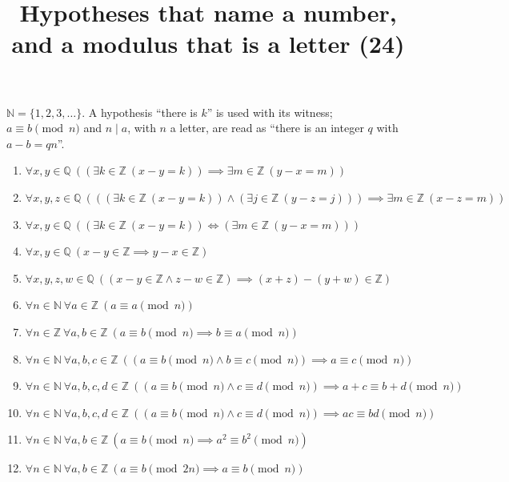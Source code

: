 \documentclass[11pt,a4paper]{article}
\title{Hypotheses that name a number, and a modulus that is a letter (24)}
\author{}
\date{}
\begin{document}
\maketitle
$\mathbb{N} = \{1, 2, 3, \ldots\}$. A hypothesis ``there is $k$'' is used with its witness; $a \equiv b \pmod{n}$ and $n \mid a$, with $n$ a letter, are read as ``there is an integer $q$ with $a - b = qn$''.

\begin{enumerate}
\item $\displaystyle \forall x, y \in \mathbb{Q}\ ((\exists k \in \mathbb{Z}\ (x - y = k)) \implies \exists m \in \mathbb{Z}\ (y - x = m))$
\item $\displaystyle \forall x, y, z \in \mathbb{Q}\ (((\exists k \in \mathbb{Z}\ (x - y = k)) \land (\exists j \in \mathbb{Z}\ (y - z = j))) \implies \exists m \in \mathbb{Z}\ (x - z = m))$
\item $\displaystyle \forall x, y \in \mathbb{Q}\ ((\exists k \in \mathbb{Z}\ (x - y = k)) \iff (\exists m \in \mathbb{Z}\ (y - x = m)))$
\item $\displaystyle \forall x, y \in \mathbb{Q}\ (x - y \in \mathbb{Z} \implies y - x \in \mathbb{Z})$
\item $\displaystyle \forall x, y, z, w \in \mathbb{Q}\ ((x - y \in \mathbb{Z} \land z - w \in \mathbb{Z}) \implies (x + z) - (y + w) \in \mathbb{Z})$
\item $\displaystyle \forall n \in \mathbb{N}\ \forall a \in \mathbb{Z}\ (a \equiv a \pmod{n})$
\item $\displaystyle \forall n \in \mathbb{Z}\ \forall a, b \in \mathbb{Z}\ (a \equiv b \pmod{n} \implies b \equiv a \pmod{n})$
\item $\displaystyle \forall n \in \mathbb{N}\ \forall a, b, c \in \mathbb{Z}\ ((a \equiv b \pmod{n} \land b \equiv c \pmod{n}) \implies a \equiv c \pmod{n})$
\item $\displaystyle \forall n \in \mathbb{N}\ \forall a, b, c, d \in \mathbb{Z}\ ((a \equiv b \pmod{n} \land c \equiv d \pmod{n}) \implies a + c \equiv b + d \pmod{n})$
\item $\displaystyle \forall n \in \mathbb{N}\ \forall a, b, c, d \in \mathbb{Z}\ ((a \equiv b \pmod{n} \land c \equiv d \pmod{n}) \implies ac \equiv bd \pmod{n})$
\item $\displaystyle \forall n \in \mathbb{N}\ \forall a, b \in \mathbb{Z}\ (a \equiv b \pmod{n} \implies a^{2} \equiv b^{2} \pmod{n})$
\item $\displaystyle \forall n \in \mathbb{N}\ \forall a, b \in \mathbb{Z}\ (a \equiv b \pmod{2n} \implies a \equiv b \pmod{n})$

\end{enumerate}
\end{document}
